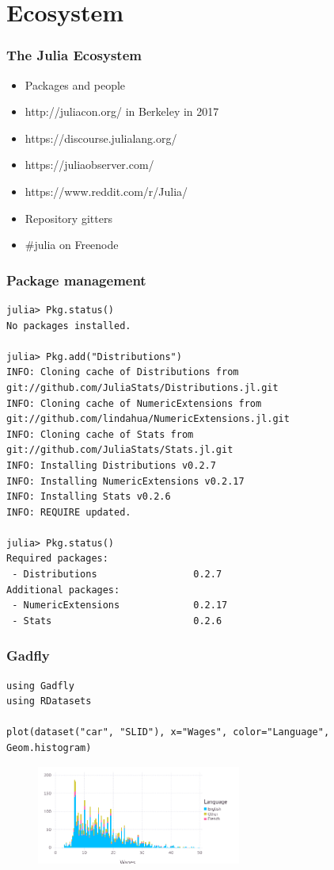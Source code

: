 \section{Ecosystem}
\begin{frame}
	\frametitle{The Julia Ecosystem}
  \begin{itemize}
    \item Packages and people
    \item http://juliacon.org/ in Berkeley in 2017
    \item https://discourse.julialang.org/
    \item https://juliaobserver.com/
    \item https://www.reddit.com/r/Julia/
    \item Repository gitters
    \item \#julia on Freenode
  \end{itemize}
\end{frame}

\begin{frame}[fragile]
	\frametitle{Package management}
  \begin{tiny}
  \begin{verbatim}
julia> Pkg.status()
No packages installed.

julia> Pkg.add("Distributions")
INFO: Cloning cache of Distributions from git://github.com/JuliaStats/Distributions.jl.git
INFO: Cloning cache of NumericExtensions from git://github.com/lindahua/NumericExtensions.jl.git
INFO: Cloning cache of Stats from git://github.com/JuliaStats/Stats.jl.git
INFO: Installing Distributions v0.2.7
INFO: Installing NumericExtensions v0.2.17
INFO: Installing Stats v0.2.6
INFO: REQUIRE updated.

julia> Pkg.status()
Required packages:
 - Distributions                 0.2.7
Additional packages:
 - NumericExtensions             0.2.17
 - Stats                         0.2.6
  \end{verbatim}
  \end{tiny}
\end{frame}

\begin{frame}[fragile]
	\frametitle{Gadfly}
  \begin{tiny}
  \begin{verbatim}
using Gadfly
using RDatasets

plot(dataset("car", "SLID"), x="Wages", color="Language", Geom.histogram)
  \end{verbatim}
  \end{tiny}
  \begin{figure}[ht]
    \centering
    \includegraphics[width=0.6\textwidth]{gadfly0}
  \end{figure}
\end{frame}

